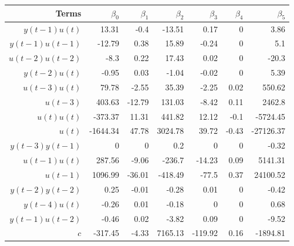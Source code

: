 \begin{tabular}{rrrrrrr}
Terms & $\beta_0$ & $\beta_1$ & $\beta_2$ & $\beta_3$ & $\beta_4$ & $\beta_5$ \\ 
\hline 
$y(t-1)u(t)$ & 13.31 & -0.4 & -13.51 & 0.17 & 0 & 3.86 \\ 
$y(t-1)u(t-1)$ & -12.79 & 0.38 & 15.89 & -0.24 & 0 & 5.1 \\ 
$u(t-2)u(t-2)$ & -8.3 & 0.22 & 17.43 & 0.02 & 0 & -20.3 \\ 
$y(t-2)u(t)$ & -0.95 & 0.03 & -1.04 & -0.02 & 0 & 5.39 \\ 
$u(t-3)u(t)$ & 79.78 & -2.55 & 35.39 & -2.25 & 0.02 & 550.62 \\ 
$u(t-3)$ & 403.63 & -12.79 & 131.03 & -8.42 & 0.11 & 2462.8 \\ 
$u(t)u(t)$ & -373.37 & 11.31 & 441.82 & 12.12 & -0.1 & -5724.45 \\ 
$u(t)$ & -1644.34 & 47.78 & 3024.78 & 39.72 & -0.43 & -27126.37 \\ 
$y(t-3)y(t-1)$ & 0 & 0 & 0.2 & 0 & 0 & -0.32 \\ 
$u(t-1)u(t)$ & 287.56 & -9.06 & -236.7 & -14.23 & 0.09 & 5141.31 \\ 
$u(t-1)$ & 1096.99 & -36.01 & -418.49 & -77.5 & 0.37 & 24100.52 \\ 
$y(t-2)y(t-2)$ & 0.25 & -0.01 & -0.28 & 0.01 & 0 & -0.42 \\ 
$y(t-4)u(t)$ & -0.26 & 0.01 & -0.18 & 0 & 0 & 0.68 \\ 
$y(t-1)u(t-2)$ & -0.46 & 0.02 & -3.82 & 0.09 & 0 & -9.52 \\ 
$c$ & -317.45 & -4.33 & 7165.13 & -119.92 & 0.16 & -1894.81 \\ 
\hline 
\end{tabular}
